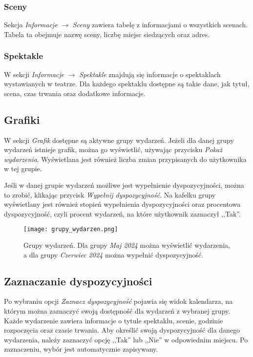 \documentclass[shortabstract]{iithesis}
\begin{document}
\subsubsection{Sceny}
\label{stages}
Sekcja \textit{Informacje} $\rightarrow$ \textit{Sceny} zawiera tabelę z informacjami o wszystkich scenach. Tabela ta obejmuje nazwę sceny, liczbę miejsc siedzących oraz adres.


\subsubsection{Spektakle}
W sekcji \textit{Informacje} $\rightarrow$ \textit{Spektakle} znajdują się informacje o spektaklach wystawianych w teatrze. Dla każdego spektaklu dostępne są takie dane, jak tytuł, scena, czas trwania oraz dodatkowe informacje.


\subsection{Grafiki}

W sekcji \textit{Grafik} dostępne są aktywne grupy wydarzeń. Jeżeli dla danej grupy wydarzeń istnieje grafik, można go wyświetlić, używając przycisku \textit{Pokaż wydarzenia}. Wyświetlana jest również liczba zmian przypisanych do użytkownika w tej grupie.

Jeśli w danej grupie wydarzeń możliwe jest wypełnienie dyspozycyjności, można to zrobić, klikając przycisk \textit{Wypełnij dyspozycyjność}. Na kafelku grupy wyświetlany jest również stopień wypełnienia dyspozycyjności oraz procentowa dyspozycyjność, czyli procent wydarzeń, na które użytkownik zaznaczył ,,Tak''.

\begin{figure}[h!]
    \centering
    \texttt{[image: grupy\_wydarzen.png]}
    \caption{Grupy wydarzeń. Dla grupy \textit{Maj 2024} można wyświetlić wydarzenia, a dla grupy \textit{Czerwiec 2024} można wypełnić dyspozycyjność.}
    \label{fig:event-groups}
\end{figure}

\subsection{Zaznaczanie dyspozycyjności}

Po wybraniu opcji \textit{Zaznacz dyspozycyjność} pojawia się widok kalendarza, na którym można zaznaczyć swoją dostępność dla wydarzeń z wybranej grupy. Każde wydarzenie zawiera informacje o tytule spektaklu, scenie, godzinie rozpoczęcia oraz czasie trwania. Aby określić swoją dyspozycyjność dla danego wydarzenia, należy zaznaczyć opcję ,,Tak'' lub ,,Nie'' w odpowiednim miejscu. Po zaznaczeniu, wybór jest automatycznie zapisywany.
\end{document}
